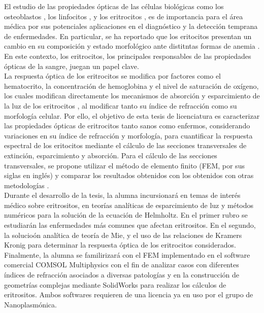\documentclass[11pt,letterpaper]{article}
\begin{document}
	El estudio de las propiedades ópticas de las células biológicas como los osteoblastos \cite{antunesOpticalPropertiesBone2019}, los linfocitos \cite{yoonIdentificationNonactivatedLymphocytes2017}, y los eritrocitos \cite{bosschaartLiteratureReviewNovel2014}, es de importancia para el área médica por sus potenciales aplicaciones en el diagnóstico y la detección temprana de enfermedades.  En particular, se ha reportado que  los eritocitos  presentan un cambio en su composición y estado morfológico  ante distitntas formas de anemia \cite{bosschaartLiteratureReviewNovel2014}. En este contexto, los eritrocitos, los principales responsables de las propiedades ópticas de la sangre, juegan un papel clave.\\
	
	La respuesta óptica de los eritrocitos se modifica por factores como el hematocrito, la concentración de hemoglobina y el nivel de saturación de oxígeno, los cuales modifican directamente los mecanismos de absorción y esparcimiento de la luz de los eritrocitos \cite{bosschaartLiteratureReviewNovel2014}, al modificar tanto su índice de refracción como su morfología celular. Por ello, el objetivo de esta tesis de licenciatura es caracterizar las propiedades ópticas de eritrocitos tanto sanos como enfermos, considerando variaciones en su índice de refracción y morfología, para cuantificar la respuesta espectral de los eritocitos mediante el cálculo de las secciones transversales de extinción, esparcimiento y absorción. Para el cálculo de las secciones transversales, se propone utilizar el método de elemento finito (FEM, por sus siglas en inglés) y comparar los resultados obtenidos con los obtenidos con otras metodologías \cite{ergulComputationalStudyScattering2010,wriedtLightScatteringSingle2006}.\\
	
	Durante el desarrollo de la tesis, la alumna
	incursionará en temas de interés médico sobre eritrositos, en teorías analíticas de esparcimiento de luz y métodos numéricos para la solución de la ecuación de Helmholtz. En el primer rubro se estudiarán las enfermedades más comunes que afectan eritrositos. En el segundo, la solucioón analítica de teoría de Mie, y el uso de las relaciones de Kramers Kronig \cite{lucariniKramersKronigRelationsOptical2005} para determinar la respuesta óptica de los eritrocitos considerados. Finalmente, la alumna se familirizará con el FEM implementado en el software comercial COMSOL Multiphysics con el fin de analizar casos con diferentes índices de refracción asociados a diversas patologías y en la construcción de  geometrías complejas mediante SolidWorks para realizar los cálculos de eritrositos. Ambos softwares requieren de una licencia ya en uso por el grupo de Nanoplasmónica.\\
	
\end{document}
